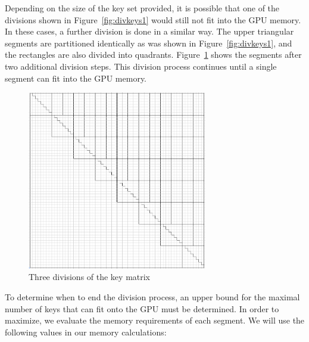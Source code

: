 \documentclass[smallextended]{svjour3}       %
\begin{document}
Depending on the size of the key set provided, it is possible that one of the
divisions shown in Figure~\ref{fig:divkeys1} would still not fit into the GPU
memory. In these cases, a further division is done in a similar way. The upper
triangular segments are partitioned identically as was shown in
Figure~\ref{fig:divkeys1}, and the rectangles are also divided into quadrants. 
Figure~\ref{fig:divkeys3} shows the segments after two additional division
steps. This division process continues until a single segment can fit into the
GPU memory.  

\begin{figure}
   \centering
   \includegraphics[width=0.7\textwidth]{three_divisions}
   \caption{Three divisions of the key matrix}
   \label{fig:divkeys3}
\end{figure}

To determine when to end the division process, an upper bound for the maximal
number of keys that can fit onto the GPU must be determined. In order to
maximize, we evaluate the memory requirements of each segment. We will use the
following values in our memory calculations:
\end{document}
